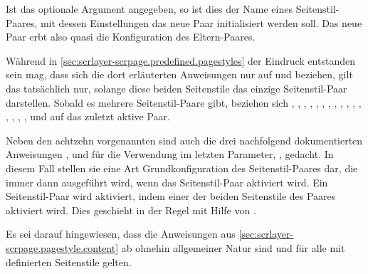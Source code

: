 Ist das optionale Argument  angegeben, so ist dies der Name
eines Seitenstil-Paares, mit dessen Einstellungen das neue Paar initialisiert
werden soll. Das neue Paar erbt also quasi die Konfiguration des
Eltern-Paares.

{\setlength{\emergencystretch}{1em}%
Während in \autoref{sec:scrlayer-scrpage.predefined.pagestyles} der Eindruck
entstanden sein mag, dass sich die dort erläuterten Anweisungen nur auf
 und  beziehen, gilt das
tatsächlich nur, solange diese beiden Seitenstile das einzige Seitenstil-Paar
darstellen. Sobald es mehrere Seitenstil-Paare gibt, beziehen sich
, ,
, ,
, ,
, ,
, ,
, ,
, ,
, ,
 und 
auf das zuletzt aktive Paar.\par}

{\setlength{\emergencystretch}{1em}%
  Neben den achtzehn vorgenannten sind auch die drei nachfolgend
  dokumentierten Anweisungen
  ,
   und
   für die
  Verwendung im letzten Parameter, , gedacht. In diesem Fall
  stellen sie eine Art Grundkonfiguration des Seitenstil-Paares dar, die immer
  dann ausgeführt wird, wenn das Seitenstil-Paar aktiviert wird. Ein
  Seitenstil-Paar wird aktiviert, indem einer der beiden Seitenstile des
  Paares aktiviert wird. Dies geschieht in der Regel mit Hilfe von
  .\par}

Es sei darauf hingewiesen, dass die Anweisungen aus
\autoref{sec:scrlayer-scrpage.pagestyle.content} ab
 ohnehin allgemeiner Natur
sind und für alle mit  definierten Seitenstile
gelten.

